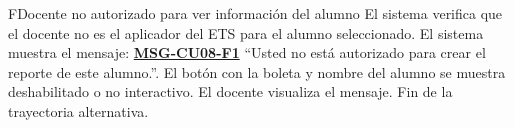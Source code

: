 \begin{UCtrayectoriaA}{F}{Docente no autorizado para ver información del alumno}
	\UCpaso El sistema verifica que el docente no es el aplicador del ETS para el alumno seleccionado.
	\UCpaso El sistema muestra el mensaje: \textbf{\hyperref[msg:CU08-F1]{MSG-CU08-F1}}{ ``Usted no está autorizado para crear el reporte de este alumno.''}.
	\UCpaso El botón con la boleta y nombre del alumno se muestra deshabilitado o no interactivo.
	\UCpaso[\UCactor] El docente visualiza el mensaje.
	\UCpaso Fin de la trayectoria alternativa.
\end{UCtrayectoriaA}

